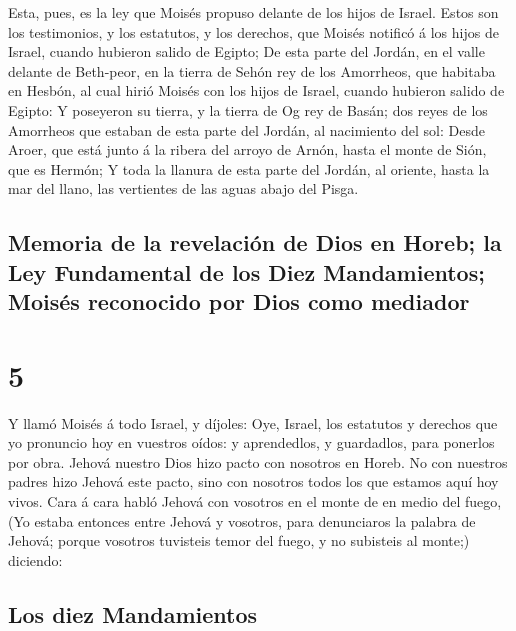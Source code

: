  Esta, pues, es la ley que Moisés propuso delante de los
hijos de Israel.  Estos son los testimonios, y los
estatutos, y los derechos, que Moisés notificó á los hijos de Israel,
cuando hubieron salido de Egipto;  De esta parte del
Jordán, en el valle delante de Beth-peor, en la tierra de Sehón rey de
los Amorrheos, que habitaba en Hesbón, al cual hirió Moisés con los
hijos de Israel, cuando hubieron salido de Egipto:  Y
poseyeron su tierra, y la tierra de Og rey de Basán; dos reyes de los
Amorrheos que estaban de esta parte del Jordán, al nacimiento del sol:
 Desde Aroer, que está junto á la ribera del arroyo de
Arnón, hasta el monte de Sión, que es Hermón;  Y toda la
llanura de esta parte del Jordán, al oriente, hasta la mar del llano,
las vertientes de las aguas abajo del Pisga.

\hypertarget{memoria-de-la-revelaciuxf3n-de-dios-en-horeb-la-ley-fundamental-de-los-diez-mandamientos-moisuxe9s-reconocido-por-dios-como-mediador}{%
\subsection{Memoria de la revelación de Dios en Horeb; la Ley
Fundamental de los Diez Mandamientos; Moisés reconocido por Dios como
mediador}\label{memoria-de-la-revelaciuxf3n-de-dios-en-horeb-la-ley-fundamental-de-los-diez-mandamientos-moisuxe9s-reconocido-por-dios-como-mediador}}

\hypertarget{section-05-5}{%
\section{5}\label{section-05-5}}

 Y llamó Moisés á todo Israel, y díjoles: Oye, Israel, los
estatutos y derechos que yo pronuncio hoy en vuestros oídos: y
aprendedlos, y guardadlos, para ponerlos por obra.  Jehová
nuestro Dios hizo pacto con nosotros en Horeb.  No con
nuestros padres hizo Jehová este pacto, sino con nosotros todos los que
estamos aquí hoy vivos.  Cara á cara habló Jehová con
vosotros en el monte de en medio del fuego,  (Yo estaba
entonces entre Jehová y vosotros, para denunciaros la palabra de Jehová;
porque vosotros tuvisteis temor del fuego, y no subisteis al monte;)
diciendo:

\hypertarget{los-diez-mandamientos}{%
\subsection{Los diez Mandamientos}\label{los-diez-mandamientos}}

